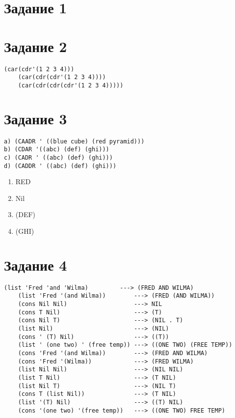 \documentclass[a4paper,14pt, unknownkeysallowed]{extreport}
\begin{document}


\section*{Задание 1}


\section*{Задание 2}

\begin{lstlisting}[]
	(car(cdr'(1 2 3 4)))
	(car(cdr(cdr'(1 2 3 4))))
	(car(cdr(cdr(cdr'(1 2 3 4)))))
\end{lstlisting}

\section*{Задание 3}

\begin{lstlisting}[]
a) (CAADR ' ((blue cube) (red pyramid))) 
b) (CDAR '((abc) (def) (ghi))) 
c) (CADR ' ((abc) (def) (ghi)))
d) (CADDR ' ((abc) (def) (ghi)))
\end{lstlisting}

\begin{enumerate}
	\item RED
	\item Nil
	\item (DEF)
	\item (GHI)
\end{enumerate}

\section*{Задание 4}

\begin{lstlisting}[]
	(list 'Fred 'and 'Wilma) 		 ---> (FRED AND WILMA)
	(list 'Fred '(and Wilma))		 ---> (FRED (AND WILMA))
	(cons Nil Nil) 					 ---> NIL
	(cons T Nil) 					 ---> (T)
	(cons Nil T) 					 ---> (NIL . T)
	(list Nil) 						 ---> (NIL)
	(cons ' (T) Nil) 				 ---> ((T))
	(list ' (one two) ' (free temp)) ---> ((ONE TWO) (FREE TEMP))
	(cons 'Fred '(and Wilma)) 		 ---> (FRED AND WILMA)
	(cons 'Fred '(Wilma))   		 ---> (FRED WILMA)
	(list Nil Nil) 					 ---> (NIL NIL)
	(list T Nil)					 ---> (T NIL)
	(list Nil T)					 ---> (NIL T)
	(cons T (list Nil))				 ---> (T NIL)
	(list '(T) Nil)					 ---> ((T) NIL)
	(cons '(one two) '(free temp))	 ---> ((ONE TWO) FREE TEMP)
\end{lstlisting}
\end{document}
